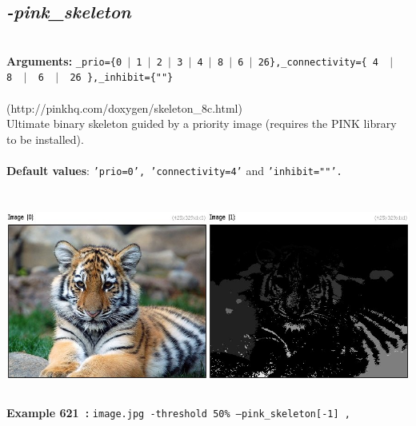 \documentclass[a4paper,11pt,twoside]{book}
\begin{document}
\subsection{\emph{-pink\_skeleton} }\vspace*{-0.5em}
~\\\textbf{Arguments: } 
{\small \texttt{\_prio=\{0~$|$~1~$|$~2~$|$~3~$|$~4~$|$~8~$|$~6~$|$~26\},\_connectivity=\{ 4 ~$|$~ 8 ~$|$~ 6 ~$|$~ 26 \},\_inhibit=\{""\}}}\\~\\
(http://pinkhq.com/doxygen/skeleton\_8c.html)
~\\Ultimate binary skeleton guided by a priority image (requires the PINK library to be installed).
~\\~\\\textbf{Default values}: {\small \texttt{'prio=0', 'connectivity=4'} and \texttt{'inhibit=""'.}}
\begin{center}\includegraphics[keepaspectratio=true,height=7cm,width=\textwidth]{img/gmic_def621.jpg}\\
{\footnotesize \textbf{Example 621~:} \texttt{image.jpg -threshold 50\% --pink\_skeleton[-1] ,}}
\end{center}
\end{document}
